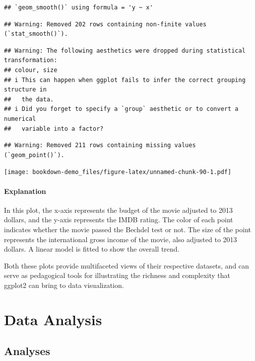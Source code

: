 \documentclass[
  b5paper]{book}
\begin{document}
\begin{verbatim}
## `geom_smooth()` using formula = 'y ~ x'
\end{verbatim}

\begin{verbatim}
## Warning: Removed 202 rows containing non-finite values (`stat_smooth()`).
\end{verbatim}

\begin{verbatim}
## Warning: The following aesthetics were dropped during statistical transformation:
## colour, size
## i This can happen when ggplot fails to infer the correct grouping structure in
##   the data.
## i Did you forget to specify a `group` aesthetic or to convert a numerical
##   variable into a factor?
\end{verbatim}

\begin{verbatim}
## Warning: Removed 211 rows containing missing values (`geom_point()`).
\end{verbatim}

\texttt{[image: bookdown-demo\_files/figure-latex/unnamed-chunk-90-1.pdf]}

\hypertarget{explanation-1}{%
\subsubsection*{Explanation}\label{explanation-1}}

In this plot, the x-axis represents the budget of the movie adjusted to 2013 dollars, and the y-axis represents the IMDB rating. The color of each point indicates whether the movie passed the Bechdel test or not. The size of the point represents the international gross income of the movie, also adjusted to 2013 dollars. A linear model is fitted to show the overall trend.

Both these plots provide multifaceted views of their respective datasets, and can serve as pedagogical tools for illustrating the richness and complexity that ggplot2 can bring to data visualization.

\hypertarget{data-analysis}{%
\chapter{Data Analysis}\label{data-analysis}}

\hypertarget{analyses-1}{%
\section{Analyses}\label{analyses-1}}
\end{document}
